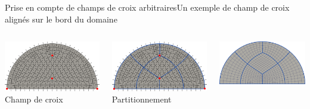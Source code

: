 \documentclass[compress,10pt,aspectratio=169]{beamer}
\begin{document}
\begin{frame}{Prise en compte de champs de croix arbitraires}{Un exemple de champ de croix alignés sur le bord du domaine}

    \begin{columns}
        \begin{column}{0.33\textwidth}
        \centering
        \includegraphics[scale=0.087]{images/demi_disc_align_first.pdf} \hspace{0.2cm}
        \footnotesize Champ de croix
        \end{column}
        \begin{column}{0.33\textwidth}
        \centering
        \includegraphics[scale=0.087]{images/demi_disc_align_second.pdf} \hspace{0.2cm}
        \footnotesize Partitionnement
        \end{column}
        \begin{column}{0.33\textwidth}
        \centering
        \includegraphics[scale=0.087]{images/demi_disc_align_third.pdf} \hspace{0.2cm}

\end{column}
\end{columns}
\end{frame}
\end{document}
